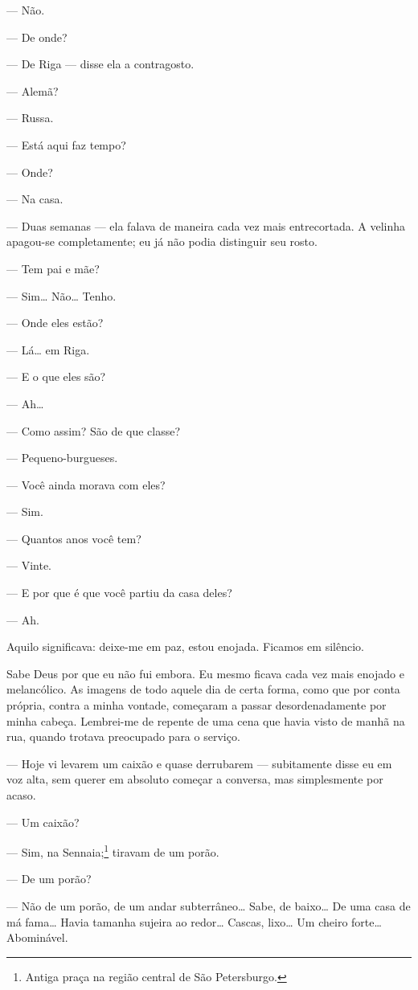 --- Não.

--- De onde?

--- De Riga --- disse ela a contragosto.

--- Alemã?

--- Russa.

--- Está aqui faz tempo?

--- Onde?

--- Na casa.

--- Duas semanas --- ela falava de maneira cada vez mais entrecortada. A
velinha apagou-se completamente; eu já não podia distinguir seu rosto.

--- Tem pai e mãe?

--- Sim\ldots{} Não\ldots{} Tenho.

--- Onde eles estão?

--- Lá\ldots{} em Riga.

--- E o que eles são?

--- Ah\ldots{}

--- Como assim? São de que classe?

--- Pequeno-burgueses.

--- Você ainda morava com eles?

--- Sim.

--- Quantos anos você tem?

--- Vinte.

--- E por que é que você partiu da casa deles?

--- Ah.

Aquilo significava: deixe-me em paz, estou enojada. Ficamos em silêncio.

Sabe Deus por que eu não fui embora. Eu mesmo ficava cada vez mais
enojado e melancólico. As imagens de todo aquele dia de certa forma,
como que por conta própria, contra a minha vontade, começaram a passar
desordenadamente por minha cabeça. Lembrei-me de repente de uma cena
que havia visto de manhã na rua, quando trotava preocupado para o
serviço.

--- Hoje vi levarem um caixão e quase derrubarem --- subitamente disse eu em
voz alta, sem querer em absoluto começar a conversa, mas simplesmente
por acaso.

--- Um caixão?

--- Sim, na Sennaia;\footnote{ Antiga praça na região central de São
Petersburgo.} tiravam de um porão.

--- De um porão?

--- Não de um porão, de um andar subterrâneo\ldots{} Sabe, de baixo\ldots{} De uma
casa de má fama\ldots{} Havia tamanha sujeira ao redor\ldots{} Cascas, lixo\ldots{} Um
cheiro forte\ldots{} Abominável.

